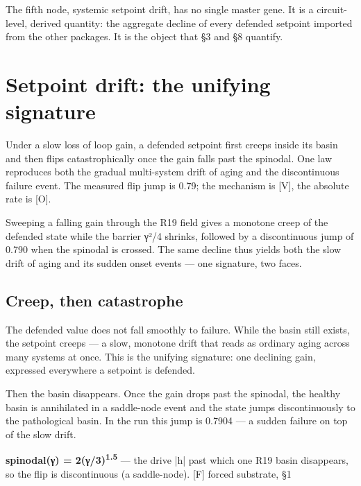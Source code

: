 \documentclass[11pt]{article}
\begin{document}
The fifth node, systemic setpoint drift, has no single master gene. It is a circuit-level, derived quantity: the aggregate decline of every defended setpoint imported from the other packages. It is the object that §3 and §8 quantify.

\section{Setpoint drift: the unifying signature}

\begin{answerbox}Under a slow loss of loop gain, a defended setpoint first creeps inside its basin and then flips catastrophically once the gain falls past the spinodal. One law reproduces both the gradual multi-system drift of aging and the discontinuous failure event. The measured flip jump is 0.79; the mechanism is [V], the absolute rate is [O].\end{answerbox}

\begin{abstractbox}Sweeping a falling gain through the R19 field gives a monotone creep of the defended state while the barrier γ²/4 shrinks, followed by a discontinuous jump of 0.790 when the spinodal is crossed. The same decline thus yields both the slow drift of aging and its sudden onset events — one signature, two faces.\end{abstractbox}

\subsection*{Creep, then catastrophe}

The defended value does not fall smoothly to failure. While the basin still exists, the setpoint creeps — a slow, monotone drift that reads as ordinary aging across many systems at once. This is the unifying signature: one declining gain, expressed everywhere a setpoint is defended.

Then the basin disappears. Once the gain drops past the spinodal, the healthy basin is annihilated in a saddle-node event and the state jumps discontinuously to the pathological basin. In the run this jump is 0.7904 — a sudden failure on top of the slow drift.

\begin{vpbox}\textbf{spinodal(γ) = 2(γ/3)\textsuperscript{1.5}} — the drive |h| past which one R19 basin disappears, so the flip is discontinuous (a saddle-node). [F] forced substrate, §1\end{vpbox}
\end{document}
